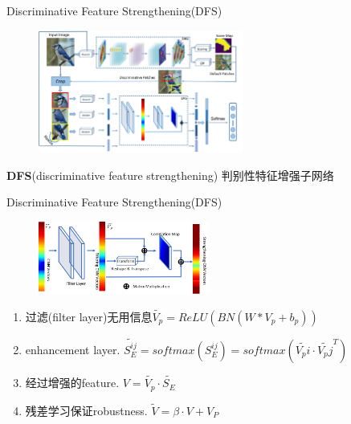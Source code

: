 \begin{frame}{Discriminative Feature Strengthening(DFS)}
    \begin{figure}
        \centering
        \includegraphics[width=0.6\textwidth]{docs/paperReading/CDL/framework.png}
    \end{figure}
    \textbf{DFS}(discriminative feature strengthening) 判别性特征增强子网络
\end{frame}
\begin{frame}{Discriminative Feature Strengthening(DFS)} 
    \begin{figure}
        \centering
        \includegraphics[width=0.5\textwidth]{docs/paperReading/CDL/dfs.png}
    \end{figure}
    \begin{scriptsize}
        \begin{enumerate}
            \item 过滤(filter layer)无用信息$\tilde{V_p}=ReLU(BN(W*V_p+b_p))$
            \item enhancement layer. $\tilde{S_E^{ij}}=softmax(S_E^{ij})=softmax(\tilde{V_pi}\cdot \tilde{V_pj}^T)$
            \item 经过增强的feature. $V=\tilde{V_p}\cdot \tilde{S_E}$
            \item 残差学习保证robustness. $\tilde{V}=\beta\cdot V+V_P$
        \end{enumerate}
    \end{scriptsize}
\end{frame}

